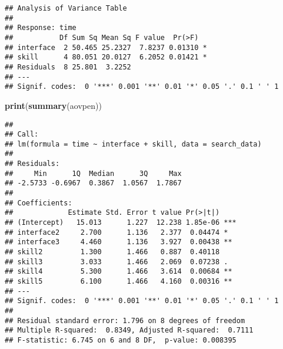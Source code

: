 \documentclass[11pt,]{article}
\newenvironment{Shaded}{\begin{snugshade}}{\end{snugshade}}
\newcommand{\KeywordTok}[1]{\textcolor[rgb]{0.13,0.29,0.53}{\textbf{{#1}}}}
\newcommand{\DataTypeTok}[1]{\textcolor[rgb]{0.13,0.29,0.53}{{#1}}}
\newcommand{\CharTok}[1]{\textcolor[rgb]{0.31,0.60,0.02}{{#1}}}
\newcommand{\StringTok}[1]{\textcolor[rgb]{0.31,0.60,0.02}{{#1}}}
\newcommand{\CommentTok}[1]{\textcolor[rgb]{0.56,0.35,0.01}{\textit{{#1}}}}
\newcommand{\OtherTok}[1]{\textcolor[rgb]{0.56,0.35,0.01}{{#1}}}
\newcommand{\NormalTok}[1]{{#1}}
\begin{document}
\begin{Shaded}
\end{Shaded}

\begin{verbatim}
## Analysis of Variance Table
## 
## Response: time
##           Df Sum Sq Mean Sq F value  Pr(>F)  
## interface  2 50.465 25.2327  7.8237 0.01310 *
## skill      4 80.051 20.0127  6.2052 0.01421 *
## Residuals  8 25.801  3.2252                  
## ---
## Signif. codes:  0 '***' 0.001 '**' 0.01 '*' 0.05 '.' 0.1 ' ' 1
\end{verbatim}

\begin{Shaded}
\begin{Highlighting}[]
\KeywordTok{print}\NormalTok{(}\KeywordTok{summary}\NormalTok{(aovpen))}
\end{Highlighting}
\end{Shaded}

\begin{verbatim}
## 
## Call:
## lm(formula = time ~ interface + skill, data = search_data)
## 
## Residuals:
##     Min      1Q  Median      3Q     Max 
## -2.5733 -0.6967  0.3867  1.0567  1.7867 
## 
## Coefficients:
##             Estimate Std. Error t value Pr(>|t|)    
## (Intercept)   15.013      1.227  12.238 1.85e-06 ***
## interface2     2.700      1.136   2.377  0.04474 *  
## interface3     4.460      1.136   3.927  0.00438 ** 
## skill2         1.300      1.466   0.887  0.40118    
## skill3         3.033      1.466   2.069  0.07238 .  
## skill4         5.300      1.466   3.614  0.00684 ** 
## skill5         6.100      1.466   4.160  0.00316 ** 
## ---
## Signif. codes:  0 '***' 0.001 '**' 0.01 '*' 0.05 '.' 0.1 ' ' 1
## 
## Residual standard error: 1.796 on 8 degrees of freedom
## Multiple R-squared:  0.8349, Adjusted R-squared:  0.7111 
## F-statistic: 6.745 on 6 and 8 DF,  p-value: 0.008395
\end{verbatim}
\end{document}
